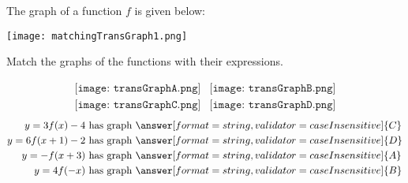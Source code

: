 \documentclass{ximera}
\author{Nala Lakos \and Kyle Parsons}
\begin{document}
\begin{exercise}

The graph of a function $f$ is given below:

\begin{image}
\texttt{[image: matchingTransGraph1.png]}
\end{image}

Match the graphs of the functions with their expressions.

\[
\begin{array}{cc}
\texttt{[image: transGraphA.png]} & \texttt{[image: transGraphB.png]}\\
\texttt{[image: transGraphC.png]} & \texttt{[image: transGraphD.png]}
\end{array}
\]
\begin{align*}
  y=3f(x)-4\text{ has graph }&\answer[format=string,validator=caseInsensitive]{C}\\
 y=6f(x+1)-2\text{ has graph }&\answer[format=string,validator=caseInsensitive]{D}\\
y=-f(x+3)\text{ has graph }&\answer[format=string,validator=caseInsensitive]{A}\\
 y=4f(-x)\text{ has graph }&\answer[format=string,validator=caseInsensitive]{B}
\end{align*}

\end{exercise}
\end{document}
